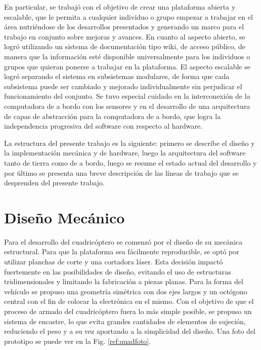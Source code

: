 \documentclass[a4paper, conference]{IEEEtran}
\begin{document}
En particular, se trabajó con el objetivo de crear una plataforma abierta y escalable, que le permita a cualquier individuo o grupo empezar a trabajar en el área nutriéndose de los desarrollos presentados y generando un marco para el trabajo en conjunto sobre mejoras y avances. En cuanto al aspecto abierto, se logró utilizando un sistema de documentación tipo wiki, de acceso público, de manera que la información esté disponible universalmente para los individuos o grupos que quieran ponerse a trabajar en la plataforma. El aspecto escalable se logró separando el sistema en subsistemas modulares, de forma que cada subsistema puede ser cambiado y mejorado individualmente sin perjudicar el funcionamiento del conjunto. Se tuvo especial cuidado en la interconexión de la computadora de a bordo con los sensores y en el desarrollo de una arquitectura de capas de abstracción para la computadora de a bordo, que logra la independencia progresiva del software con respecto al hardware. 

La estructura del presente trabajo es la siguiente: primero se describe el diseño y la implementación mecánica y de hardware, luego la arquitectura del software tanto de tierra como de a bordo, luego se resume el estado actual del desarrollo y por último se presenta una breve descripción de las líneas de trabajo que se desprenden del presente trabajo.

\vspace{5 mm}

\section{Diseño Mecánico}

Para el desarrollo del cuadricóptero se comenzó por el diseño de su mecánica estructural. Para que la plataforma sea fácilmente reproducible, se optó por utilizar planchas de corte y una cortadora láser. Esta decisión impactó fuertemente en las posibilidades de diseño, evitando el uso de estructuras tridimensionales y limitando la fabricación a piezas planas. Para la forma del vehículo se propuso una geometría simétrica con dos ejes largos y un octógono central con el fin de colocar la electrónica en el mismo. Con el objetivo de que el proceso de armado del cuadricóptero fuera lo más simple posible, se propuso un sistema de encastre, lo que evita grandes cantidades de elementos de sujeción, reduciendo el peso y a su vez aportando a la simplicidad del diseño. Una foto del prototipo se puede ver en la Fig. \ref{ref:quadfoto}.
\end{document}
